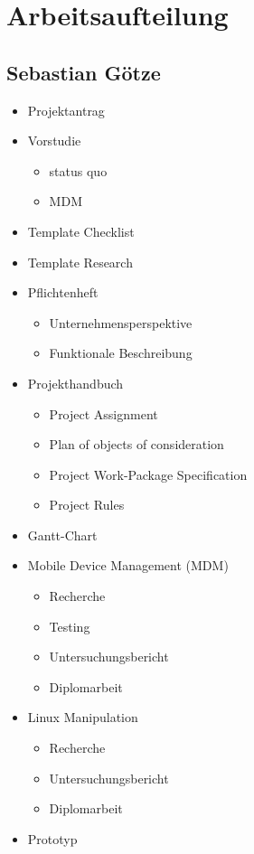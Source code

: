\newpage

\section{Arbeitsaufteilung}
\begin{minipage}[t]{0.47\textwidth}
	\subsection{Sebastian Götze}
	\begin{itemize}
		\item Projektantrag
		\item Vorstudie
		\begin{itemize}
			\item status quo
			\item MDM
		\end{itemize}
		\item Template Checklist
		\item Template Research
		\item Pflichtenheft
		\begin{itemize}
			\item Unternehmensperspektive
			\item Funktionale Beschreibung
		\end{itemize}
		\item Projekthandbuch
		\begin{itemize}
			\item Project Assignment
			\item Plan of objects of consideration
			\item Project Work-Package Specification
			\item Project Rules
		\end{itemize}
		\item Gantt-Chart
		\item Mobile Device Management (MDM)
		\begin{itemize}
			\item Recherche
			\item Testing
			\item Untersuchungsbericht
			\item Diplomarbeit
		\end{itemize}
		\item Linux Manipulation
		\begin{itemize}
			\item Recherche
			\item Untersuchungsbericht
			\item Diplomarbeit
		\end{itemize}
		\item Prototyp
	\end{itemize}
\end{minipage}%
